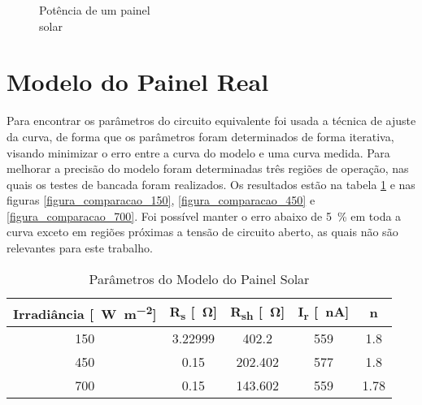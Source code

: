 \begin{figure}[!htpb]
\begin{minipage}{.5\textwidth}
\begin{center}
\caption[caption]{Potência de um painel \\\hspace{\textwidth} solar}
\label{figura_potência_painel_irradiância}
\end{center}
\end{minipage}
\end{figure}

\section{Modelo do Painel Real}

Para encontrar os parâmetros do circuito equivalente foi usada a técnica de ajuste da curva, de forma que os parâmetros foram determinados de forma iterativa, visando minimizar o erro entre a curva do modelo e uma curva medida. Para melhorar a precisão do modelo foram determinadas três regiões de operação, nas quais os testes de bancada foram realizados. Os resultados estão na tabela \ref{parametros_modelo_painel_solar} e nas figuras \ref{figura_comparacao_150}, \ref{figura_comparacao_450} e \ref{figura_comparacao_700}. Foi possível manter o erro abaixo de \SI{5}{\percent} em toda a curva exceto em regiões próximas a tensão de circuito aberto, as quais não são relevantes para este trabalho.

\begin{table}[!htpb]
\centering
\begin{tabular}{c c c c c}
\\ \hline
Irradiância [\SI{}{\watt\per\square\metre}] & R\textsubscript{s} [\SI{}{\ohm}] & R\textsubscript{sh} [\SI{}{\ohm}] & I\textsubscript{r} [\SI{}{\nano\ampere}] & n \\ \hline \hline
150 & 3.22999 & 402.2 & 559 & 1.8 \\
450 & 0.15 & 202.402 & 577 & 1.8 \\
700 & 0.15 & 143.602 & 559 & 1.78 \\ \hline
\end{tabular}
\caption{Parâmetros do Modelo do Painel Solar}
\label{parametros_modelo_painel_solar}
\end{table}

